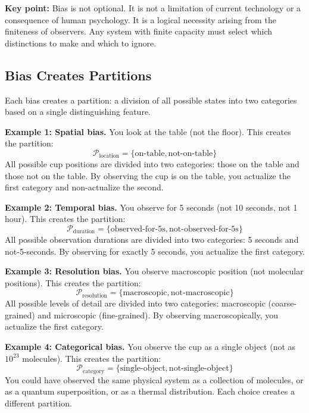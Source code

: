 \documentclass[twocolumn,10pt]{article}
\theoremstyle{definition}
\theoremstyle{remark}
\begin{document}
\vspace{0.2cm}
\noindent\textbf{Key point:} Bias is not optional. It is not a limitation of current technology or a consequence of human psychology. It is a logical necessity arising from the finiteness of observers. Any system with finite capacity must select which distinctions to make and which to ignore.

\subsection{Bias Creates Partitions}

Each bias creates a partition: a division of all possible states into two categories based on a single distinguishing feature.

\vspace{0.2cm}
\noindent\textbf{Example 1: Spatial bias.} You look at the table (not the floor). This creates the partition:
\begin{equation}
\mathcal{P}_{\text{location}} = \{\text{on-table}, \text{not-on-table}\}
\end{equation}
All possible cup positions are divided into two categories: those on the table and those not on the table. By observing the cup is on the table, you actualize the first category and non-actualize the second.

\vspace{0.2cm}
\noindent\textbf{Example 2: Temporal bias.} You observe for 5 seconds (not 10 seconds, not 1 hour). This creates the partition:
\begin{equation}
\mathcal{P}_{\text{duration}} = \{\text{observed-for-5s}, \text{not-observed-for-5s}\}
\end{equation}
All possible observation durations are divided into two categories: 5 seconds and not-5-seconds. By observing for exactly 5 seconds, you actualize the first category.

\vspace{0.2cm}
\noindent\textbf{Example 3: Resolution bias.} You observe macroscopic position (not molecular positions). This creates the partition:
\begin{equation}
\mathcal{P}_{\text{resolution}} = \{\text{macroscopic}, \text{not-macroscopic}\}
\end{equation}
All possible levels of detail are divided into two categories: macroscopic (coarse-grained) and microscopic (fine-grained). By observing macroscopically, you actualize the first category.

\vspace{0.2cm}
\noindent\textbf{Example 4: Categorical bias.} You observe the cup as a single object (not as $10^{23}$ molecules). This creates the partition:
\begin{equation}
\mathcal{P}_{\text{category}} = \{\text{single-object}, \text{not-single-object}\}
\end{equation}
You could have observed the same physical system as a collection of molecules, or as a quantum superposition, or as a thermal distribution. Each choice creates a different partition.
\end{document}
